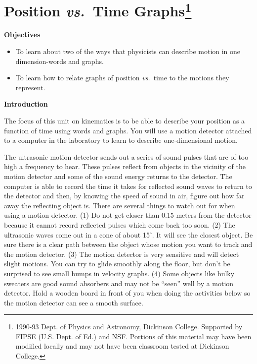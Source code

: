 
\section{Position \textit{vs.}~Time Graphs\footnote{
1990-93 Dept. of Physics and Astronomy, Dickinson College. Supported by FIPSE
(U.S. Dept. of Ed.) and NSF. Portions of this material may have been modified
locally and may not have been classroom tested at Dickinson College.
}}

\makelabheader %

\textbf{Objectives} 

\begin{itemize}
\item To learn about two of the ways that physicists can describe motion in one dimension-words
and graphs. 
\item To learn how to relate graphs of position \textit{vs.}~time to the motions they represent.
\end{itemize}
\textbf{Introduction} 

The focus of this unit on kinematics is to be able to describe your position
as a function of time using words and graphs. You will use a motion detector
attached to a computer in the laboratory to learn to describe one-dimensional
motion.

The ultrasonic motion detector sends out a series of sound pulses that are of
too high a frequency to hear. These pulses reflect from objects in the vicinity
of the motion detector and some of the sound energy returns to the detector.
The computer is able to record the time it takes for reflected sound waves to
return to the detector and then, by knowing the speed of sound in air, figure
out how far away the reflecting object is. There are several things to watch
out for when using a motion detector. (1) Do not get closer than 0.15 meters
from the detector because it cannot record reflected pulses which come back
too soon. (2) The ultrasonic waves come out in a cone of about 15\( ^{\circ } \).
It will see the closest object. Be sure there is a clear path between the object
whose motion you want to track and the motion detector. (3) The motion detector
is very sensitive and will detect slight motions. You can try to glide smoothly
along the floor, but don't be surprised to see small bumps in velocity graphs.
(4) Some objects like bulky sweaters are good sound absorbers and may not be
``seen'' well by a motion detector. Hold a wooden board in front of you when 
doing the activities below so the motion detector can see a smooth surface.

